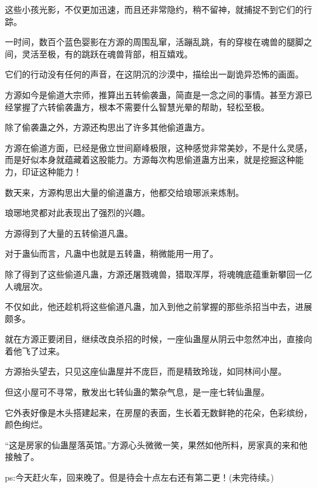 \begin{this_body}
这些小孩光影，不仅更加迅速，而且还非常隐约，稍不留神，就捕捉不到它们的行踪。

一时间，数百个蓝色婴影在方源的周围乱窜，活蹦乱跳，有的穿梭在魂兽的腿脚之间，灵活至极，有的跳跃在魂兽背部，相互嬉戏。

它们的行动没有任何的声音，在这阴沉的沙漠中，描绘出一副诡异恐怖的画面。

方源如今是偷道大宗师，推算出五转偷袭蛊，简直是一念之间的事情。甚至方源已经掌握了六转偷袭蛊方，根本不需要什么智慧光晕的帮助，轻松至极。

除了偷袭蛊之外，方源还构思出了许多其他偷道蛊方。

方源在偷道方面，已经是傲立世间巅峰极限，这种感觉非常美妙，不是什么灵感，而是好似本身就蕴藏着这股能力。方源每次构思偷道蛊方出来，就是挖掘这种能力，印证这种能力！

数天来，方源构思出大量的偷道蛊方，他都交给琅琊派来炼制。

琅琊地灵都对此表现出了强烈的兴趣。

方源得到了大量的五转偷道凡蛊。

对于蛊仙而言，凡蛊中也就是五转蛊，稍微能用一用了。

除了得到了这些偷道凡蛊，方源还屠戮魂兽，猎取浑厚，将魂魄底蕴重新攀回一亿人魂层次。

不仅如此，他还趁机将这些偷道凡蛊，加入到他之前掌握的那些杀招当中去，进展颇多。

就在方源正要闭目，继续改良杀招的时候，一座仙蛊屋从阴云中忽然冲出，直接向着他飞了过来。

方源抬头望去，只见这座仙蛊屋并不庞巨，而是精致玲珑，如同林间小屋。

但这小屋可不寻常，散发出七转仙蛊的繁杂气息，是一座七转仙蛊屋。

它外表好像是木头搭建起来，在房屋的表面，生长着无数鲜艳的花朵，色彩缤纷，颜色绚烂。

“这是房家的仙蛊屋落英馆。”方源心头微微一笑，果然如他所料，房家真的来和他接触了。

ps:今天赶火车，回来晚了。但是待会十点左右还有第二更！(未完待续。)

\end{this_body}

